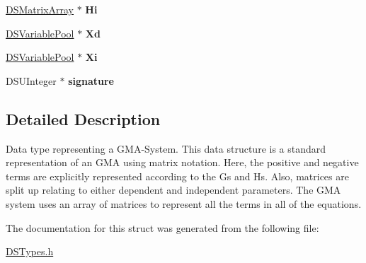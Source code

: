 \begin{DoxyCompactItemize}
\item 
\hypertarget{struct_d_s_g_m_a_system_a7a3ca05ca1b7aeecf830a58fe217cac8}{
\hyperlink{struct_d_s_matrix_array}{DSMatrixArray} $\ast$ {\bfseries Hi}}
\label{struct_d_s_g_m_a_system_a7a3ca05ca1b7aeecf830a58fe217cac8}

\item 
\hypertarget{struct_d_s_g_m_a_system_a2827047336233c327d6eeb0564d3b3aa}{
\hyperlink{struct_d_s_variable_pool}{DSVariablePool} $\ast$ {\bfseries Xd}}
\label{struct_d_s_g_m_a_system_a2827047336233c327d6eeb0564d3b3aa}

\item 
\hypertarget{struct_d_s_g_m_a_system_a0f2d639685f52fa1a385a8ceaff90686}{
\hyperlink{struct_d_s_variable_pool}{DSVariablePool} $\ast$ {\bfseries Xi}}
\label{struct_d_s_g_m_a_system_a0f2d639685f52fa1a385a8ceaff90686}

\item 
\hypertarget{struct_d_s_g_m_a_system_a2bfb90f4fc55714f8fd9b9dfbfd21e32}{
DSUInteger $\ast$ {\bfseries signature}}
\label{struct_d_s_g_m_a_system_a2bfb90f4fc55714f8fd9b9dfbfd21e32}

\end{DoxyCompactItemize}


\subsection{Detailed Description}
Data type representing a GMA-\/System. This data structure is a standard representation of an GMA using matrix notation. Here, the positive and negative terms are explicitly represented according to the Gs and Hs. Also, matrices are split up relating to either dependent and independent parameters. The GMA system uses an array of matrices to represent all the terms in all of the equations. 

The documentation for this struct was generated from the following file:\begin{DoxyCompactItemize}
\item 
\hyperlink{_d_s_types_8h}{DSTypes.h}\end{DoxyCompactItemize}
